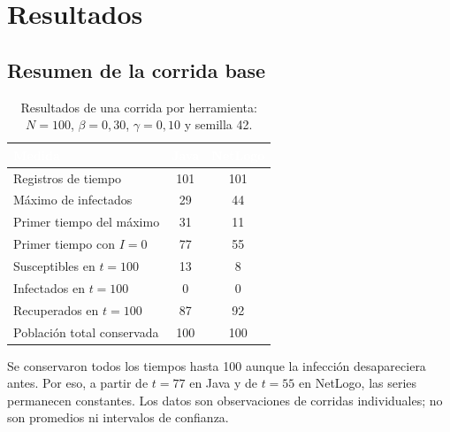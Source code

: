 \documentclass[11pt,a4paper]{article}
\renewcommand{\arraystretch}{1.08}
\newcommand{\cab}[1]{\textbf{\textcolor{white}{#1}}}
\newcommand{\tabestilo}{\arrayrulecolor{borderblue}\setlength{\arrayrulewidth}{0.75pt}\renewcommand{\arraystretch}{1.2}}
\begin{document}
\section{Resultados}
\subsection{Resumen de la corrida base}
\begin{table}[H]
\centering\tabestilo
\begin{tabularx}{\textwidth}{|Y|c|c|}
\hline{}\cab{Medida} & \cab{Java} & \cab{NetLogo} \\ \hline
Registros de tiempo & 101 & 101 \\ \hline
{}Máximo de infectados & 29 & 44 \\ \hline
Primer tiempo del máximo & 31 & 11 \\ \hline
{}Primer tiempo con $I=0$ & 77 & 55 \\ \hline
Susceptibles en $t=100$ & 13 & 8 \\ \hline
{}Infectados en $t=100$ & 0 & 0 \\ \hline
Recuperados en $t=100$ & 87 & 92 \\ \hline
{}Población total conservada & 100 & 100 \\ \hline
\end{tabularx}
\caption{Resultados de una corrida por herramienta: $N=100$, $\beta=0{,}30$, $\gamma=0{,}10$ y semilla 42.}
\label{tab:resultados}
\end{table}
Se conservaron todos los tiempos hasta 100 aunque la infección desapareciera antes. Por eso, a partir de $t=77$ en Java y de $t=55$ en NetLogo, las series permanecen constantes. Los datos son observaciones de corridas individuales; no son promedios ni intervalos de confianza.
\end{document}
